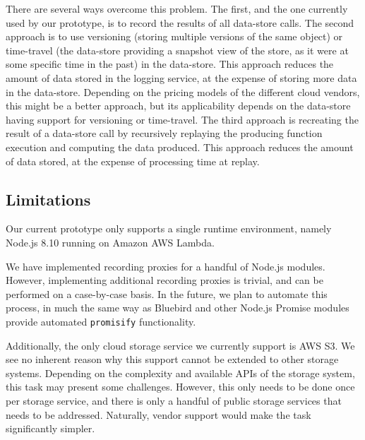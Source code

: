 There are several ways overcome this problem. The first, and the one currently
used by our prototype, is to record the results of all data-store calls. The
second approach is to use versioning (storing multiple versions of the same
object) or time-travel (the data-store providing a snapshot view of the store,
as it were at some specific time in the past) in the data-store. This approach
reduces the amount of data stored in the logging service, at the expense of
storing more data in the data-store. Depending on the pricing models of the
different cloud vendors, this might be a better approach, but its applicability
depends on the data-store having support for versioning or time-travel. The
third approach is recreating the result of a data-store call by recursively
replaying the producing function execution and computing the data produced. This
approach reduces the amount of data stored, at the expense of processing time at
replay.

\subsection{Limitations}
Our current prototype only supports a single runtime environment, namely
Node.js 8.10 running on Amazon AWS Lambda.

We have implemented recording proxies for a handful of Node.js modules.
However, implementing additional recording proxies is trivial, and can be
performed on a case-by-case basis. In the future, we plan to automate this
process, in much the same way as Bluebird and other Node.js Promise modules
provide automated \verb|promisify| functionality.

Additionally, the only cloud storage service we currently support is AWS S3. We
see no inherent reason why this support cannot be extended to other storage
systems. Depending on the complexity and available APIs of the storage system,
this task may present some challenges. However, this only needs to be done once
per storage service, and there is only a handful of public storage services
that needs to be addressed. Naturally, vendor support would make the task
significantly simpler.



